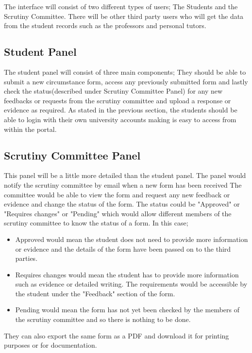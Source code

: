 \documentclass[../main.tex]{subfiles}
\begin{document}
\raggedright
The interface will consist of two different types of users; The Students and the Scrutiny Committee. There will be other third party users who will get the data from the student records such as the professors and personal tutors. 

\subsection{Student Panel}
The student panel will consist of three main components; They should be able to submit a new circumstance form, access any previously submitted form and lastly check the status(described under Scrutiny Committee Panel) for any new feedbacks or requests from the scrutiny committee and upload a response or evidence as required. As stated in the previous section, the students should be able to login with their own university accounts making is easy to access from within the portal.

\subsection{Scrutiny Committee Panel}
This panel will be a little more detailed than the student panel. The panel would notify the scrutiny committee by email when a new form has been received The committee would be able to view the form and request any new feedback or evidence and change the status of the form. The status could be "Approved" or "Requires changes" or "Pending" which would allow different members of the scrutiny committee to know the status of a form. In this case;
\begin{itemize}
\item Approved would mean the student does not need to provide more information or evidence and the details of the form have been passed on to the third parties.
\item Requires changes would mean the student has to provide more information such as evidence or detailed writing. The requirements would be accessible by the student under the "Feedback" section of the form.
\item Pending would mean the form has not yet been checked by the members of the scrutiny committee and so there is nothing to be done. 
\end{itemize}
They can also export the same form as a PDF and download it for printing purposes or for documentation. \\[2mm]
\end{document}
